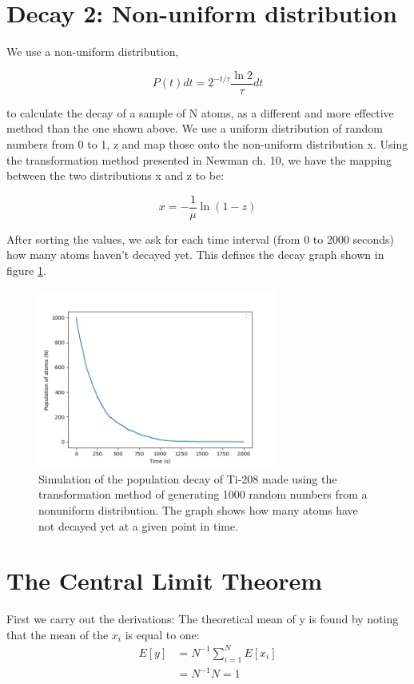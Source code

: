 \documentclass[11pt]{article}
\begin{document}
\section{Decay 2: Non-uniform distribution}
We use a non-uniform distribution,

$$ P(t)dt=2^{-t/\tau}\frac{\ln{2}}{\tau}dt $$

to calculate the decay of a sample of N atoms, as a different and more effective method than the one shown above. We use a uniform distribution of random numbers from 0 to 1, z and map those onto the non-uniform distribution x. Using the transformation method presented in Newman ch. 10, we have the mapping between the two distributions x and z to be:

$$ x=-\frac{1}{\mu}\ln{(1-z)} $$

After sorting the values, we ask for each time interval (from 0 to 2000 seconds) how many atoms haven't decayed yet. This defines the decay graph shown in figure \ref{dec2}.
\begin{figure}[!htbp]
    \centering
    \includegraphics[width=0.7\textwidth]{decay2.png}
    \caption{Simulation of the population decay of Ti-208 made using the transformation method of generating 1000 random numbers from a nonuniform distribution. The graph shows how many atoms have not decayed yet at a given point in time.}
    \label{dec2}
\end{figure}


\section{The Central Limit Theorem}
First we carry out the derivations:
The theoretical mean of y is found by noting that the mean of the $x_i$ is equal to one:
\begin{align}
    E[y] &= N^{-1}\sum_{i=1}^{N}E[x_i] \\
    &= N^{-1}N = 1
\end{align}
\end{document}

